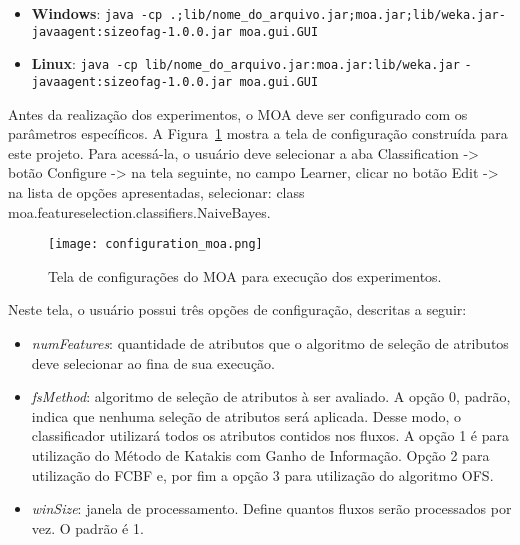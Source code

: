 \begin{itemize}
\item \textbf{Windows}: \texttt{java -cp .;lib/nome\_do\_arquivo.jar;moa.jar;lib/weka.jar}\smallbreak \texttt{-javaagent:sizeofag-1.0.0.jar moa.gui.GUI}
\item \textbf{Linux}: \texttt{java -cp lib/nome\_do\_arquivo.jar:moa.jar:lib/weka.jar} \smallbreak \texttt{-javaagent:sizeofag-1.0.0.jar moa.gui.GUI}
\end{itemize}

Antes da realização dos experimentos, o MOA deve ser configurado com os parâmetros específicos. A Figura~\ref{fig:configuracao_moa} mostra a tela de configuração construída para este projeto. Para acessá-la, o usuário deve selecionar a aba Classification -> botão Configure -> na tela seguinte, no campo Learner, clicar no botão Edit -> na lista de opções apresentadas, selecionar: class moa.featureselection.classifiers.NaiveBayes.

\begin{figure}[!htb]
  \centering
    \texttt{[image: configuration\_moa.png]}
    \caption{Tela de configurações do MOA para execução dos experimentos.}
    \label{fig:configuracao_moa}
\end{figure}

Neste tela, o usuário possui três opções de configuração, descritas a seguir:

\begin{itemize}
\item \textit{numFeatures}: quantidade de atributos que o algoritmo de seleção de atributos deve selecionar ao fina de sua execução.
\item \textit{fsMethod}: algoritmo de seleção de atributos à ser avaliado. A opção 0, padrão, indica que nenhuma seleção de atributos será aplicada. Desse modo, o classificador utilizará todos os atributos contidos nos fluxos. A opção 1 é para utilização do Método de Katakis com Ganho de Informação. Opção 2 para utilização do FCBF e, por fim a opção 3 para utilização do algoritmo OFS.
\item \textit{winSize}: janela de processamento. Define quantos fluxos serão processados por vez. O padrão é 1.
\end{itemize}